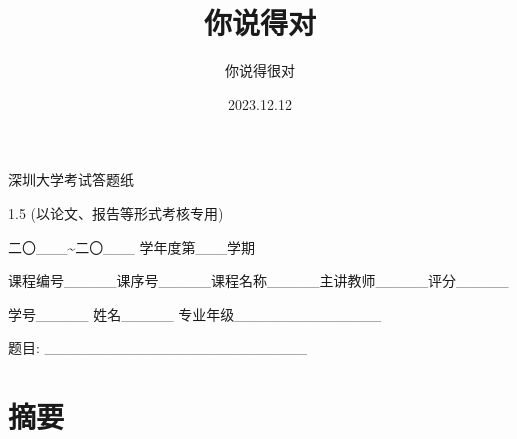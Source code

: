\documentclass[a4paper,11pt,twoside,openany]{article}
\begin{document}
\begin{center}
    \LARGE{深圳大学考试答题纸}
    \begin{spacing}{1.5}
    \normalsize{(以论文、报告等形式考核专用)}

    二〇\_\_\_\textasciitilde{}二〇\_\_\_\; 学年度第\_\_\_学期

    \normalsize{课程编号\_\_\_\_\_课序号\_\_\_\_\_课程名称\_\_\_\_\_主讲教师\_\_\_\_\_评分\_\_\_\_\_\;}

     学号\_\_\_\_\_\; 姓名\_\_\_\_\_\; 专业年级\_\_\_\_\_\_\_\_\_\_\_\_\_\_

    \end{spacing}

\end{center}
\begin{center}
    \Large{题目: \;\_\_\_\_\_\_\_\_\_\_\_\_\_\_\_\_\_\_\_\_\_\_\_\_\_ }
\end{center}
\title{你说得对}
\author{你说得很对}
\date{2023.12.12}
\maketitle

\section{摘要}
\end{document}
